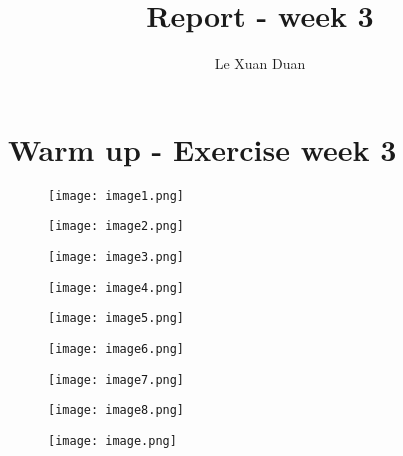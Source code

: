 \documentclass[a4paper,12pt,openany]{article}
\title{Report - week 3}
\author{Le Xuan Duan}
\begin{document}
\maketitle
\section{Warm up - Exercise week 3}
\begin{figure}[H]
    \centering
    \texttt{[image: image1.png]}
    \label{fig:enter-label}
\end{figure}

\begin{figure}[H]
    \centering
    \texttt{[image: image2.png]}
    \label{fig:enter-label}
\end{figure}

\clearpage
\begin{figure}[H]
    \centering
    \texttt{[image: image3.png]}
    \label{fig:enter-label}
\end{figure}

\begin{figure}[H]
    \centering
    \texttt{[image: image4.png]}
    \label{fig:enter-label}
\end{figure}

\clearpage
\begin{figure}[H]
    \centering
    \texttt{[image: image5.png]}
    \label{fig:enter-label}
\end{figure}

\begin{figure}[H]
    \centering
    \texttt{[image: image6.png]}
    \label{fig:enter-label}
\end{figure}

\clearpage
\begin{figure}[H]
    \centering
    \texttt{[image: image7.png]}
    \label{fig:enter-label}
\end{figure}

\begin{figure}[H]
    \centering
    \texttt{[image: image8.png]}
    \label{fig:enter-label}
\end{figure}

\begin{figure}[H]
    \centering
    \texttt{[image: image.png]}
    \label{fig:enter-label}
\end{figure}
\end{document}
